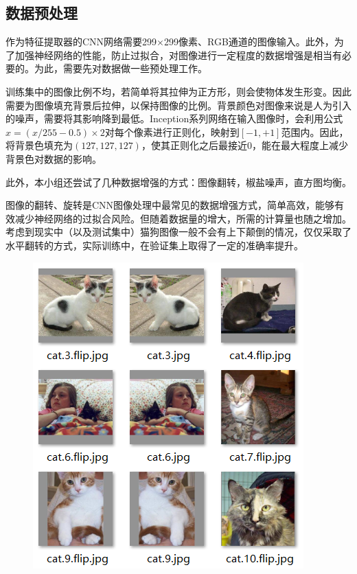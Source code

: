\documentclass[10.5pt,twocolumn]{jbuaa}
\begin{document}
\subsection{数据预处理}
作为特征提取器的CNN网络需要299×299像素、RGB通道的图像输入。此外，为了加强神经网络的性能，防止过拟合，对图像进行一定程度的数据增强是相当有必要的。为此，需要先对数据做一些预处理工作。

训练集中的图像比例不均，若简单将其拉伸为正方形，则会使物体发生形变。因此需要为图像填充背景后拉伸，以保持图像的比例。背景颜色对图像来说是人为引入的噪声，需要将其影响降到最低。Inception系列网络在输入图像时，会利用公式$x=(x/255-0.5)\times2$对每个像素进行正则化，映射到$[-1,+1]$范围内。因此，将背景色填充为$(127,127,127)$，使其正则化之后最接近0，能在最大程度上减少背景色对数据的影响。

此外，本小组还尝试了几种数据增强的方式：图像翻转，椒盐噪声，直方图均衡。

图像的翻转、旋转是CNN图像处理中最常见的数据增强方式，简单高效，能够有效减少神经网络的过拟合风险。但随着数据量的增大，所需的计算量也随之增加。考虑到现实中（以及测试集中）猫狗图像一般不会有上下颠倒的情况，仅仅采取了水平翻转的方式，实际训练中，在验证集上取得了一定的准确率提升。

\begin{figure}[h!]
\centering
\includegraphics [scale=0.8,trim=0 0 0 0]{./image/preprocess_train.png}
\end{figure}
\end{document}
